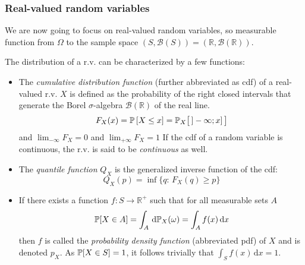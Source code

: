 \documentclass[../../Main_ManuscritThese.tex]{subfiles}
\begin{document}
\subsubsection{Real-valued random variables}
We are now going to focus on
real-valued random variables, so measurable function from $\Omega$ to
the sample space $(S,\mathcal{B}(S)) =
(\mathbb{R},\mathcal{B}(\mathbb{R}))$.
\begin{definition}
  \label{def:distribution}
  The distribution of a r.v. can be characterized by a few functions:
  \begin{itemize}
  \item The \emph{cumulative distribution function} (further
abbreviated as cdf) of a real-valued r.v. $X$ is defined as the
probability of the right closed intervals that generate the Borel
$\sigma$-algebra $\mathcal{B}(\mathbb{R})$ of the real line.
  \begin{equation} F_{X}(x) = \mathbb{P}\left[X \leq x\right] =
\mathbb{P}_X\big[\,]-\infty; x]\, \big]
  \end{equation} and $\lim_{-\infty}F_X = 0$ and $\lim_{+\infty} F_X
= 1$
If the cdf of a random variable is continuous, the r.v. is said to be \emph{continuous} as well.
  
\item The \emph{quantile function} $Q_X$ is the generalized inverse function
of the cdf:
  \begin{equation} Q_X(p) = \inf\{q:\, F_X(q)\geq p\}
  \end{equation}
\item If there exists a function $f: S\rightarrow \mathbb{R}^{+}$ such that
  for all measurable sets $A$
  \begin{equation} \mathbb{P}[X \in A] = \int_A \,\mathrm{d}\mathbb{P}_X(\omega) = \int_A f(x)\,\mathrm{d}x
\end{equation}
then $f$ is called the \emph{probability density function} (abbreviated pdf) of $X$ and is denoted $p_X$.
As $\mathbb{P}[X \in S] = 1$, it follows trivially that $\int_{S}f(x)\,\mathrm{d}x=1$.



\end{itemize}
\end{definition}
\end{document}
